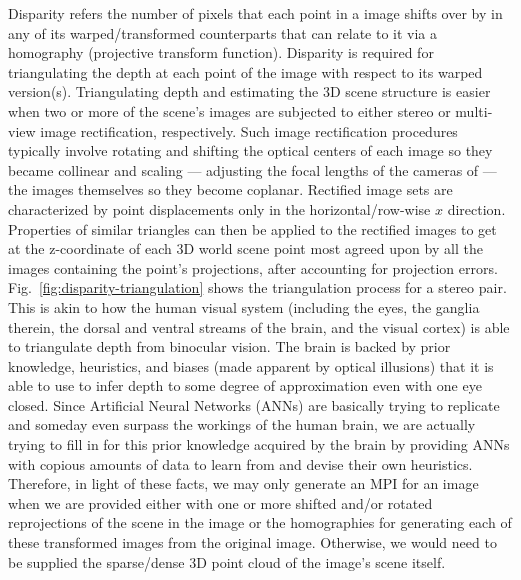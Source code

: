 Disparity refers the number of pixels that each point in a image shifts over by in any of its warped/transformed counterparts that can relate to it via a homography (projective transform function). Disparity is required for triangulating the depth at each point of the image with respect to its warped version(s). Triangulating depth and estimating the 3D scene structure is easier when two or more of the scene's images are subjected to either stereo or multi-view image rectification, respectively. Such image rectification procedures typically involve rotating and shifting the optical centers of each image so they became collinear and scaling --- adjusting the focal lengths of the cameras of --- the images themselves so they become coplanar. Rectified image sets are characterized by point displacements only in the horizontal/row-wise $x$ direction. Properties of similar triangles can then be applied to the rectified images to get at the z-coordinate of each 3D world scene point most agreed upon by all the images containing the point's projections, after accounting for projection errors. Fig.~\ref{fig:disparity-triangulation} shows the triangulation process for a stereo pair. This is akin to how the human visual system (including the eyes, the ganglia therein, the dorsal and ventral streams of the brain, and the visual cortex) is able to triangulate depth from binocular vision. The brain is backed by prior knowledge, heuristics, and biases (made apparent by optical illusions) that it is able to use to infer depth to some degree of approximation even with one eye closed. Since Artificial Neural Networks (ANNs) are basically trying to replicate and someday even surpass the workings of the human brain, we are actually trying to fill in for this prior knowledge acquired by the brain by providing ANNs with copious amounts of data to learn from and devise their own heuristics. Therefore, in light of these facts, we may only generate an MPI for an image when we are provided either with one or more shifted and/or rotated reprojections of the scene in the image or the homographies for generating each of these transformed images from the original image. Otherwise, we would need to be supplied the sparse/dense 3D point cloud of the image's scene itself. 

